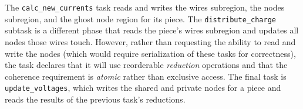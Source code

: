 The  {\tt calc\_new\_currents} task reads and writes the wires subregion, 
the nodes subregion, and the ghost node region for its piece.
The {\tt distribute\_charge} subtask is a different phase that reads the piece's 
wires subregion and updates all nodes those wires touch.  However,
rather than requesting the ability to read and write the nodes (which would
require serialization of these tasks for correctness), the task declares that
it will use reorderable {\em reduction} operations and that the coherence requirement
is {\em atomic} rather than exclusive access. The final task is 
{\tt update\_voltages}, which writes the shared and private nodes for a piece
and reads the results of the previous task's reductions.

  






